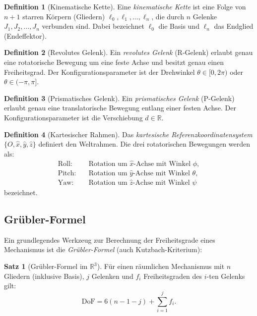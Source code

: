 ﻿\documentclass[a4paper,12pt]{article}
\theoremstyle{definition}
\newtheorem{definition}{Definition}
\newtheorem{satz}{Satz}
\begin{document}
\begin{definition}[Kinematische Kette]
	Eine \emph{kinematische Kette} ist eine Folge von $n+1$ starren Körpern (Gliedern) $\ell_0, \ell_1, \ldots, \ell_n$, die durch $n$ Gelenke $J_1, J_2, \ldots, J_n$ verbunden sind. Dabei bezeichnet $\ell_0$ die Basis und $\ell_n$ das Endglied (Endeffektor).
\end{definition}

\begin{definition}[Revolutes Gelenk]
	Ein \emph{revolutes Gelenk} (R-Gelenk) erlaubt genau eine rotatorische Bewegung um eine feste Achse und besitzt genau einen Freiheitsgrad. Der Konfigurationsparameter ist der Drehwinkel $\theta \in [0, 2\pi)$ oder $\theta \in (-\pi, \pi]$.
\end{definition}

\begin{definition}[Prismatisches Gelenk]
	Ein \emph{prismatisches Gelenk} (P-Gelenk) erlaubt genau eine translatorische Bewegung entlang einer festen Achse. Der Konfigurationsparameter ist die Verschiebung $d \in \mathbb{R}$.
\end{definition}

\begin{definition}[Kartesischer Rahmen]
	Das \emph{kartesische Referenzkoordinatensystem} $\{O, \hat{x}, \hat{y}, \hat{z}\}$ definiert den Weltrahmen. Die drei rotatorischen Bewegungen werden als:
	\begin{align*}
		\text{Roll:}  & \quad \text{Rotation um } \hat{x}\text{-Achse mit Winkel } \phi, \\
		\text{Pitch:} & \quad \text{Rotation um } \hat{y}\text{-Achse mit Winkel } \theta, \\
		\text{Yaw:}   & \quad \text{Rotation um } \hat{z}\text{-Achse mit Winkel } \psi
	\end{align*}
	bezeichnet.
\end{definition}

\subsection{Grübler-Formel}

Ein grundlegendes Werkzeug zur Berechnung der Freiheitsgrade eines Mechanismus ist die \emph{Grübler-Formel} (auch Kutzbach-Kriterium):

\begin{satz}[Grübler-Formel im $\mathbb{R}^3$]
\label{satz:gruebler}
	Für einen räumlichen Mechanismus mit $n$ Gliedern (inklusive Basis), $j$ Gelenken und $f_i$ Freiheitsgraden des $i$-ten Gelenks gilt:
	\[
		\text{DoF} = 6(n - 1 - j) + \sum_{i=1}^{j} f_i.
	\]
\end{satz}
\end{document}
